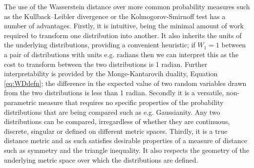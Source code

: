 \documentclass[fleqn,usenatbib,useAMS]{mnras}
\begin{document}
The use of the Wasserstein distance over more common probability measures such as the Kullback–Leibler divergence or the  Kolmogorov-Smirnoff test has a number of advantages. Firstly, it is intuitive, being the minimal amount of work required to transform one distribution into another. It also inherits the units of the underlying distributions, providing a convenient heuristic; if $W_1 =1$ between a pair of distributions with units e.g. radians then we can interpret this as the cost to transform between the two distributions is 1 radian. Further interpretability is provided by the Monge-Kantarovih duality, Equation \eqref{eq:WDdefn}; the difference in the expected value of two random variables drawn from the two distributions is less than 1 radian. Secondly it is a versatile, non-parametric measure that requires no specific properties of the probability distributions that are being compared such as e.g. Gaussianity. Any two distributions can be compared, irregardless of whether they are continuous, discrete, singular or defined on different metric spaces. Thirdly, it is a true distance metric and as such satisfies desirable properties of a measure of distance such as symmetry and the triangle inequality. It also respects the geometry of the underlying metric space over which the distributions are defined.  















%
%
%
%
%
%
\end{document}
